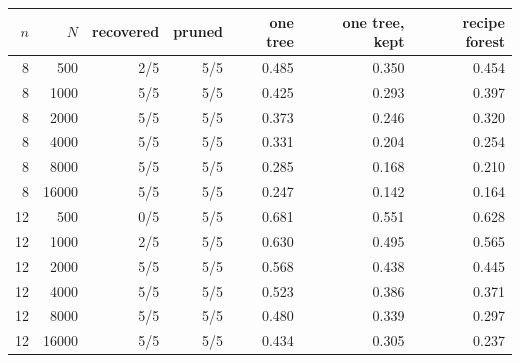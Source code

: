 \begin{tabular}{@{}rrrrrrr@{}}\toprule
$n$ & $N$ & recovered & pruned & one tree & one tree, kept & recipe forest\\\midrule
8 & 500 & 2/5 & 5/5 & 0.485 & 0.350 & 0.454\\
8 & 1000 & 5/5 & 5/5 & 0.425 & 0.293 & 0.397\\
8 & 2000 & 5/5 & 5/5 & 0.373 & 0.246 & 0.320\\
8 & 4000 & 5/5 & 5/5 & 0.331 & 0.204 & 0.254\\
8 & 8000 & 5/5 & 5/5 & 0.285 & 0.168 & 0.210\\
8 & 16000 & 5/5 & 5/5 & 0.247 & 0.142 & 0.164\\
12 & 500 & 0/5 & 5/5 & 0.681 & 0.551 & 0.628\\
12 & 1000 & 2/5 & 5/5 & 0.630 & 0.495 & 0.565\\
12 & 2000 & 5/5 & 5/5 & 0.568 & 0.438 & 0.445\\
12 & 4000 & 5/5 & 5/5 & 0.523 & 0.386 & 0.371\\
12 & 8000 & 5/5 & 5/5 & 0.480 & 0.339 & 0.297\\
12 & 16000 & 5/5 & 5/5 & 0.434 & 0.305 & 0.237\\
\bottomrule\end{tabular}